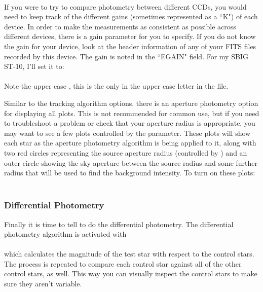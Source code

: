 \documentclass{article}
\begin{document}
\indent {} \\

	If you were to try to compare photometry between different CCDs, you would need to keep track of the different gains (sometimes represented as a ``K") of each device. In order to make the measurements as consistent as possible across different devices, there is a gain parameter for you to specify. If you do not know the gain for your device, look at the header information of any of your FITS files recorded by this device. The gain is noted in the ``EGAIN" field. For my SBIG ST-10, I'll set it to:\\
	
\indent {} \\

\noindent Note the upper case , this is the only in the upper case letter in the  file. 

	Similar to the tracking algorithm options, there is an aperture photometry option for displaying all plots. This is not recommended for common use, but if you need to troubleshoot a problem or check that your aperture radius is appropriate, you may want to see a few plots controlled by the  parameter. These plots will show each star as the aperture photometry algorithm is being applied to it, along with two red circles representing the source aperture radius (controlled by ) and an outer circle showing the sky aperture between the source radius and some further radius that will be used to find the background intensity. To turn on these plots:\\

\indent {}\\


\subsubsection{Differential Photometry}

Finally it is time to tell \oscaar  to do the differential photometry. The differential photometry algorithm is activated with \\

\indent {}\\

\noindent which calculates the magnitude of the test star with respect to the control stars. The process is repeated to compare each control star against all of the other control stars, as well. This way you can visually inspect the control stars to make sure they aren't variable. 
\end{document}
